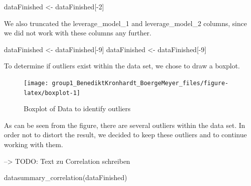 \documentclass[
  11pt,
  a4paper,
  twoside]{scrbook}
\newenvironment{Shaded}{\begin{snugshade}}{\end{snugshade}}
\newcommand{\DecValTok}[1]{\textcolor[rgb]{0.00,0.00,0.81}{#1}}
\newcommand{\FunctionTok}[1]{\textcolor[rgb]{0.00,0.00,0.00}{#1}}
\newcommand{\NormalTok}[1]{#1}
\newcommand{\OtherTok}[1]{\textcolor[rgb]{0.56,0.35,0.01}{#1}}
\newcommand{\SpecialCharTok}[1]{\textcolor[rgb]{0.00,0.00,0.00}{#1}}
\begin{document}
\begin{Shaded}
\begin{Highlighting}[]
\NormalTok{dataFinished }\OtherTok{\textless{}{-}}\NormalTok{ dataFinished[}\SpecialCharTok{{-}}\DecValTok{2}\NormalTok{]}
\end{Highlighting}
\end{Shaded}

\linespread{1}

We also truncated the leverage\_model\_1 and leverage\_model\_2 columns, since we did not work with these columns any further.

\linespread{1}

\begin{Shaded}
\begin{Highlighting}[]
\NormalTok{dataFinished }\OtherTok{\textless{}{-}}\NormalTok{ dataFinished[}\SpecialCharTok{{-}}\DecValTok{9}\NormalTok{]}
\NormalTok{dataFinished }\OtherTok{\textless{}{-}}\NormalTok{ dataFinished[}\SpecialCharTok{{-}}\DecValTok{9}\NormalTok{]}
\end{Highlighting}
\end{Shaded}

\linespread{1}

To determine if outliers exist within the data set, we chose to draw a boxplot.

\begin{figure}

{\centering \texttt{[image: group1\_BenediktKronhardt\_BoergeMeyer\_files/figure-latex/boxplot-1]} 

}

\caption{Boxplot of Data to identify outliers}\label{fig:boxplot}
\end{figure}

As can be seen from the figure, there are several outliers within the data set. In order not to distort the result, we decided to keep these outliers and to continue working with them.

--\textgreater{} TODO: Text zu Correlation schreiben

\linespread{1}

\begin{Shaded}
\begin{Highlighting}[]
\FunctionTok{datasummary\_correlation}\NormalTok{(dataFinished)}
\end{Highlighting}
\end{Shaded}

\linespread{1}
\end{document}
